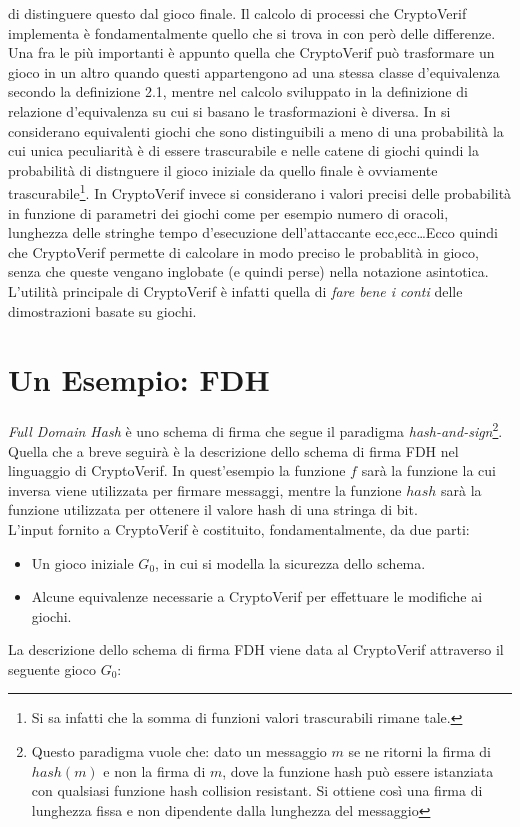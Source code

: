 \documentclass[a4paper,openright,twoside,12pt]{report}
\begin{document}
di distinguere questo dal gioco finale. 
Il calcolo di processi che CryptoVerif implementa \`e fondamentalmente quello che si trova in \cite{BlanchetJaggardScedrovTsayAsiaCCS08} con per\`o delle differenze.
Una fra le pi\`u importanti \`e appunto quella che CryptoVerif pu\`o trasformare un gioco in un altro quando questi appartengono ad una stessa classe d'equivalenza secondo la definizione 2.1, mentre 
nel calcolo sviluppato in \cite{BlanchetJaggardScedrovTsayAsiaCCS08} la definizione di relazione d'equivalenza su cui si basano le trasformazioni \`e diversa.
In \cite{BlanchetJaggardScedrovTsayAsiaCCS08} si considerano equivalenti giochi che sono distinguibili a meno di una probabilit\`a la cui unica peculiarit\`a \`e di essere trascurabile e nelle catene di giochi quindi la probabilit\`a di distnguere il gioco
iniziale da quello finale \`e ovviamente trascurabile\footnote{Si sa infatti che la somma di funzioni valori trascurabili rimane tale.}. In CryptoVerif invece si considerano i valori precisi delle probabilit\`a in funzione
di parametri dei giochi come per esempio numero di oracoli, lunghezza delle stringhe tempo d'esecuzione dell'attaccante ecc,ecc\dots Ecco quindi che CryptoVerif permette di calcolare in modo preciso le probablit\`a in 
gioco, senza che queste vengano inglobate (e quindi perse) nella notazione asintotica. 
L'utilit\`a principale di CryptoVerif \`e infatti quella di \emph{fare bene i conti} delle dimostrazioni basate su giochi. 

\section{Un Esempio: FDH}
\emph{Full Domain Hash} \`e uno schema di firma che segue il paradigma \emph{hash-and-sign}\footnote{Questo paradigma vuole che: dato un messaggio $m$ se ne ritorni 
la firma di $hash(m)$ e non la firma di $m$, dove la funzione hash pu\`o essere istanziata con qualsiasi funzione hash collision resistant. 
Si ottiene cos\`i una firma di lunghezza fissa e non dipendente dalla lunghezza del messaggio}. 
Quella che a breve seguir\`a \`e la descrizione dello schema di firma FDH nel linguaggio di CryptoVerif. In quest'esempio la funzione $f$ sar\`a la funzione la cui inversa
viene utilizzata per firmare messaggi, mentre la funzione $hash$ sar\`a la funzione utilizzata per ottenere il valore hash di una stringa di bit.\\
L'input fornito a CryptoVerif \`e costituito, fondamentalmente, da due parti: 
\begin{itemize}
 \item Un gioco iniziale $G_0$, in cui si modella la sicurezza dello schema.
 \item Alcune equivalenze necessarie a CryptoVerif per effettuare le modifiche ai giochi. 
\end{itemize}
La descrizione dello schema di firma FDH viene data al CryptoVerif attraverso il seguente gioco $G_0$:
\end{document}
